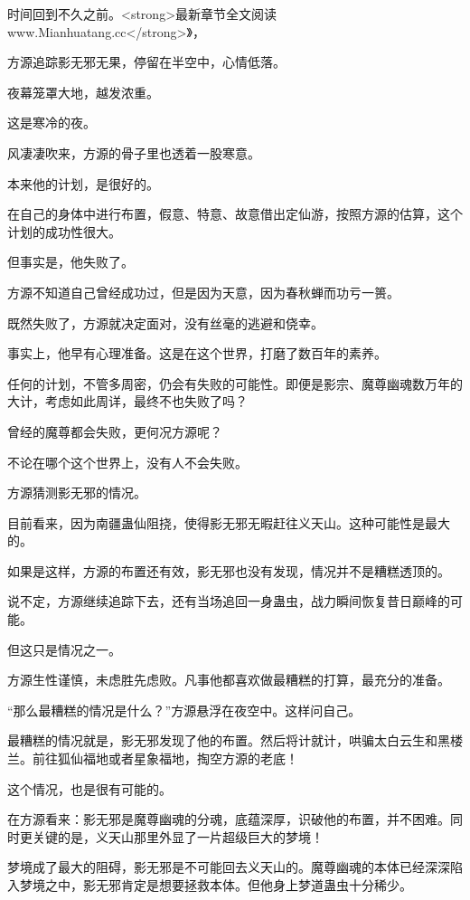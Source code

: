
\begin{this_body}

时间回到不久之前。<strong>最新章节全文阅读www.Mianhuatang.cc</strong>》，

方源追踪影无邪无果，停留在半空中，心情低落。

夜幕笼罩大地，越发浓重。

这是寒冷的夜。

风凄凄吹来，方源的骨子里也透着一股寒意。

本来他的计划，是很好的。

在自己的身体中进行布置，假意、特意、故意借出定仙游，按照方源的估算，这个计划的成功性很大。

但事实是，他失败了。

方源不知道自己曾经成功过，但是因为天意，因为春秋蝉而功亏一篑。

既然失败了，方源就决定面对，没有丝毫的逃避和侥幸。

事实上，他早有心理准备。这是在这个世界，打磨了数百年的素养。

任何的计划，不管多周密，仍会有失败的可能性。即便是影宗、魔尊幽魂数万年的大计，考虑如此周详，最终不也失败了吗？

曾经的魔尊都会失败，更何况方源呢？

不论在哪个这个世界上，没有人不会失败。

方源猜测影无邪的情况。

目前看来，因为南疆蛊仙阻挠，使得影无邪无暇赶往义天山。这种可能性是最大的。

如果是这样，方源的布置还有效，影无邪也没有发现，情况并不是糟糕透顶的。

说不定，方源继续追踪下去，还有当场追回一身蛊虫，战力瞬间恢复昔日巅峰的可能。

但这只是情况之一。

方源生性谨慎，未虑胜先虑败。凡事他都喜欢做最糟糕的打算，最充分的准备。

“那么最糟糕的情况是什么？”方源悬浮在夜空中。这样问自己。

最糟糕的情况就是，影无邪发现了他的布置。然后将计就计，哄骗太白云生和黑楼兰。前往狐仙福地或者星象福地，掏空方源的老底！

这个情况，也是很有可能的。

在方源看来：影无邪是魔尊幽魂的分魂，底蕴深厚，识破他的布置，并不困难。同时更关键的是，义天山那里外显了一片超级巨大的梦境！

梦境成了最大的阻碍，影无邪是不可能回去义天山的。魔尊幽魂的本体已经深深陷入梦境之中，影无邪肯定是想要拯救本体。但他身上梦道蛊虫十分稀少。


\end{this_body}
